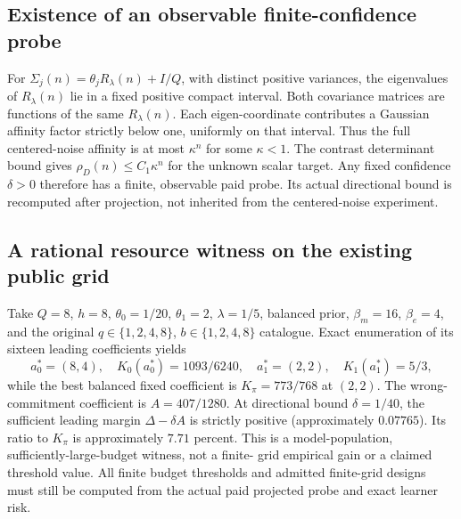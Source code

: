\subsection{Existence of an observable finite-confidence probe}
For $\Sigma_j(n)=\theta_jR_\lambda(n)+I/Q$, with distinct positive variances,
the eigenvalues of $R_\lambda(n)$ lie in a fixed positive compact interval.
Both covariance matrices are functions of the same $R_\lambda(n)$.
Each eigen-coordinate contributes a Gaussian affinity factor strictly below
one, uniformly on that interval.
Thus the full centered-noise affinity is at most $\kappa^n$ for some
$\kappa<1$.
The contrast determinant bound gives $\rho_D(n)\le C_1\kappa^n$ for the
unknown scalar target.
Any fixed confidence $\delta>0$ therefore has a finite, observable paid probe.
Its actual directional bound is recomputed after projection, not inherited
from the centered-noise experiment.

\subsection{A rational resource witness on the existing public grid}
Take $Q=8$, $h=8$, $\theta_0=1/20$, $\theta_1=2$, $\lambda=1/5$,
balanced prior, $\beta_m=16$, $\beta_e=4$, and the original
$q\in\{1,2,4,8\}$, $b\in\{1,2,4,8\}$ catalogue.
Exact enumeration of its sixteen leading coefficients yields
\[
a_0^*=(8,4),\quad K_0(a_0^*)=1093/6240,\quad
a_1^*=(2,2),\quad K_1(a_1^*)=5/3,
\]
while the best balanced fixed coefficient is $K_\pi=773/768$ at $(2,2)$.
The wrong-commitment coefficient is $A=407/1280$.
At directional bound $\delta=1/40$, the sufficient leading margin
$\Delta-\delta A$ is strictly positive (approximately $0.07765$).
Its ratio to $K_\pi$ is approximately $7.71$ percent.
This is a model-population, sufficiently-large-budget witness, not a finite-
grid empirical gain or a claimed threshold value.
All finite budget thresholds and admitted finite-grid designs must still be
computed from the actual paid projected probe and exact learner risk.
